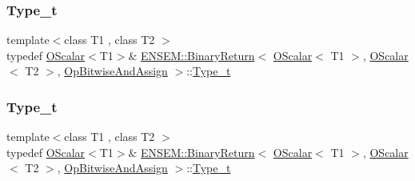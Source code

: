 \subsubsection{\texorpdfstring{Type\_t}{Type\_t}\hspace{0.1cm}{\footnotesize\ttfamily [1/3]}}
{\footnotesize\ttfamily template$<$class T1 , class T2 $>$ \\
typedef \mbox{\hyperlink{classENSEM_1_1OScalar}{O\+Scalar}}$<$T1$>$\& \mbox{\hyperlink{structENSEM_1_1BinaryReturn}{E\+N\+S\+E\+M\+::\+Binary\+Return}}$<$ \mbox{\hyperlink{classENSEM_1_1OScalar}{O\+Scalar}}$<$ T1 $>$, \mbox{\hyperlink{classENSEM_1_1OScalar}{O\+Scalar}}$<$ T2 $>$, \mbox{\hyperlink{structENSEM_1_1OpBitwiseAndAssign}{Op\+Bitwise\+And\+Assign}} $>$\+::\mbox{\hyperlink{structENSEM_1_1BinaryReturn_3_01OScalar_3_01T1_01_4_00_01OScalar_3_01T2_01_4_00_01OpBitwiseAndAssign_01_4_a113164aa69cac863b97d72236eb744cb}{Type\+\_\+t}}}

\mbox{\label{structENSEM_1_1BinaryReturn_3_01OScalar_3_01T1_01_4_00_01OScalar_3_01T2_01_4_00_01OpBitwiseAndAssign_01_4_a113164aa69cac863b97d72236eb744cb}} 
\subsubsection{\texorpdfstring{Type\_t}{Type\_t}\hspace{0.1cm}{\footnotesize\ttfamily [2/3]}}
{\footnotesize\ttfamily template$<$class T1 , class T2 $>$ \\
typedef \mbox{\hyperlink{classENSEM_1_1OScalar}{O\+Scalar}}$<$T1$>$\& \mbox{\hyperlink{structENSEM_1_1BinaryReturn}{E\+N\+S\+E\+M\+::\+Binary\+Return}}$<$ \mbox{\hyperlink{classENSEM_1_1OScalar}{O\+Scalar}}$<$ T1 $>$, \mbox{\hyperlink{classENSEM_1_1OScalar}{O\+Scalar}}$<$ T2 $>$, \mbox{\hyperlink{structENSEM_1_1OpBitwiseAndAssign}{Op\+Bitwise\+And\+Assign}} $>$\+::\mbox{\hyperlink{structENSEM_1_1BinaryReturn_3_01OScalar_3_01T1_01_4_00_01OScalar_3_01T2_01_4_00_01OpBitwiseAndAssign_01_4_a113164aa69cac863b97d72236eb744cb}{Type\+\_\+t}}}

